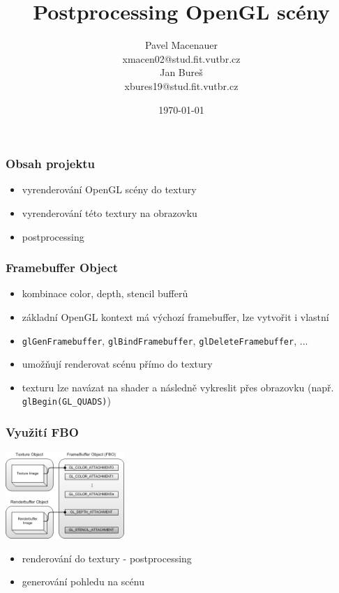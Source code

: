 \documentclass{beamer}
\title{\large{\textbf{Postprocessing OpenGL scény}}}
\author{Pavel Macenauer \\ \tiny{xmacen02@stud.fit.vutbr.cz} \\ \normalsize{Jan Bureš} \\ \tiny{xbures19@stud.fit.vutbr.cz}}
\date{\tiny{\today}}
\institute[FIT VUTBR]
{
	\inst{}
	Fakulta Informačních Technologií \\
	Vysoké Učení Technické v Brně
}
\begin{document}
	\begin{frame}[t,plain]
	\titlepage

	\vspace{-7mm}
	\end{frame}


	\begin{frame}[t,fragile]
		\frametitle{\textbf{Obsah projektu}}	
		\Large
		\begin{itemize}
			\item vyrenderování OpenGL scény do textury
			\item vyrenderování této textury na obrazovku
			\item postprocessing
		\end{itemize}
	\end{frame}
	

	\begin{frame}[t,fragile]
		\frametitle{\textbf{Framebuffer Object}}
	
		\begin{itemize}
			\item kombinace color, depth, stencil bufferů
			\item základní OpenGL kontext má výchozí framebuffer, lze vytvořit i vlastní
			\item \verb|glGenFramebuffer|, \verb|glBindFramebuffer|, \verb|glDeleteFramebuffer|, ...			
			\item umožňují renderovat scénu přímo do textury
			\item texturu lze navázat na shader a následně vykreslit přes obrazovku (např. \verb|glBegin(GL_QUADS)|)
		\end{itemize}
	\end{frame}
		

	\begin{frame}[t,fragile]
		\frametitle{\textbf{Využití FBO}}	
	
		\begin{center}
		\includegraphics[height=33mm]{gl_fbo01.png}
		\end{center}		
	
		\Large
		\begin{itemize}
			\item renderování do textury - postprocessing
			\item generování pohledu na scénu
		\end{itemize}
								
	\end{frame}
	
\end{document}
